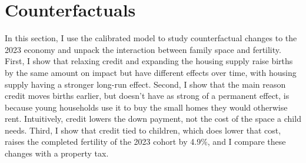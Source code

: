 \providecommand{\pend}{\textcolor{red}{[pending]}}
\providecommand{\oldv}[1]{\textcolor{red}{#1}}
\providecommand{\chk}{\textcolor{red}{$^{\ddagger}$}}
\newcommand{\PRF}{../../output/model/experiments/housing_supply/20261021_paper_results}

\section{Counterfactuals}
\label{sec:policy}

In this section, I use the calibrated model to study counterfactual changes to
the 2023 economy and unpack the interaction between family space and
fertility. First, I show that relaxing credit and expanding the housing
supply raise births by the same amount on impact but have different effects
over time, with housing supply having a stronger long-run effect. Second, I show that the main reason credit moves births earlier, but doesn't have as strong of a permanent effect, is  because young
households use it to buy the small homes they would otherwise rent. Intuitively, credit lowers
the down payment, not the cost of the space a child needs. Third, I show that
credit tied to children, which does lower that cost, raises the completed
fertility of the 2023 cohort by 4.9\%, and I compare these changes with a
property tax.


